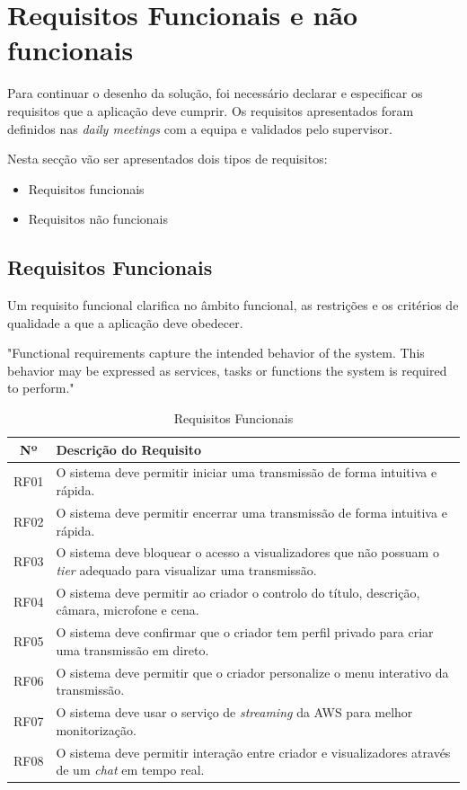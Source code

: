 \section{Requisitos Funcionais e não funcionais}

Para continuar o desenho da solução, foi necessário declarar e especificar os requisitos que a aplicação deve cumprir. Os requisitos apresentados foram definidos nas \textit{daily meetings} com a equipa e validados pelo supervisor.

Nesta secção vão ser apresentados dois tipos de requisitos:

\begin{itemize}
    \item Requisitos funcionais
    \item Requisitos não funcionais
\end{itemize}

\subsection{Requisitos Funcionais}

Um requisito funcional clarifica no âmbito funcional, as restrições e os critérios de qualidade a que a aplicação deve obedecer.

"Functional requirements capture the intended behavior of the system. This behavior may be expressed as
services, tasks or functions the system is required to perform."\cite{MalanBredemeyer2001FuncReqUseCases}


\begin{table}[H]
\small
\caption{Requisitos Funcionais}
\label{tab:req-funcionais}
\begin{center}
\begin{tabular}{|c|p{13cm}|}
\hline
\textbf{Nº} & \textbf{Descrição do Requisito} \\ \hline
RF01 & O sistema deve permitir iniciar uma transmissão de forma intuitiva e rápida. \\ \hline
RF02 & O sistema deve permitir encerrar uma transmissão de forma intuitiva e rápida. \\ \hline
RF03 & O sistema deve bloquear o acesso a visualizadores que não possuam o \textit{tier} adequado para visualizar uma transmissão. \\ \hline
RF04 & O sistema deve permitir ao criador o controlo do título, descrição, câmara, microfone e cena. \\ \hline
RF05 & O sistema deve confirmar que o criador tem perfil privado para criar uma transmissão em direto. \\ \hline
RF06 & O sistema deve permitir que o criador personalize o menu interativo da transmissão. \\ \hline
RF07 & O sistema deve usar o serviço de \textit{streaming} da AWS para melhor monitorização. \\ \hline
RF08 & O sistema deve permitir interação entre criador e visualizadores através de um \textit{chat} em tempo real. \\ \hline
\end{tabular}
\end{center}
\end{table}


